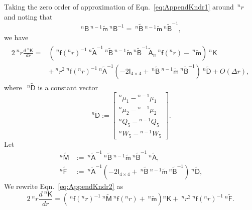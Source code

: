 \documentclass[preprint,10pt,times]{elsarticle}
\numberwithin{equation}{section}
\renewcommand{\u}[1]{\boldsymbol{#1}}
\newcommand{\usf}[1]{\u{\mathsf #1}}
\renewcommand{\>}{$\Rightarrow$}
\begin{document}
Taking the zero order of approximation of Eqn.~\eqref{eq:AppendKndr1} around~${}^{n}\!{r}$ and noting that
\begin{equation}
	~^{n}{\usf{B}} ~^{n-1}\tilde{\usf{m}} ~^{n}{\usf{B}}^{-1} = ~^{n}\tilde{\usf{B}} ~^{n-1}\tilde{\usf{m}} ~^{n}\tilde{\usf{B}}^{-1},
\end{equation}
we have
\begin{equation}
\begin{aligned}
	\begin{split}
	2 ~^{n}\!{r} \frac{d ~^{n}{\usf{K}}}{dr} = & \left( ~^{n}\usf{f}({}^{n}\!r)^{-1} ~^{n}\tilde{\usf{A}}^{-1} ~^{n}\tilde{\usf{B}} ~^{n-1}\tilde{\usf{m}} ~^{n}\tilde{\usf{B}}^{-1} \tilde{\usf{A}}_n ~^{n}\usf{f}({}^{n}\!r) - ~^{n}\tilde{\usf{m}} \right) ~^{n}{\usf{K}} \\
	& + ~^{n}\!{r}^2 ~^{n}\usf{f}({}^{n}\!r)^{-1} ~^{n}\tilde{\usf{A}}^{-1} \left( -2\usf{I}_{4\times 4} + ~^{n}\tilde{\usf{B}} ~^{n-1}\tilde{\usf{m}} ~^{n}\tilde{\usf{B}}^{-1} \right) ~^{n}\tilde{\usf{D}} + O(\Delta r),
	\end{split}
\end{aligned}
\label{eq:AppendKndr2}
\end{equation}
where~$~^{n}\tilde{\usf{D}}$ is a constant vector
\begin{equation}
	~^{n}\tilde{\usf{D}}
	:=
	\begin{bmatrix}
		{}^{n}\!{\mu_{1}}-{}^{n-1}\!{\mu_{1}} \\ {}^{n}\!{\mu_{2}}-{}^{n-1}\!{\mu_{2}}  \\ {}^{n}\!{Q_{5}}-{}^{n-1}\!{Q_{5}} \\ {}^{n}\!{W_{5}}-{}^{n-1}\!{W_{5}}
	\end{bmatrix} .
\end{equation}
Let
\begin{subequations}
	\begin{align}
	~^{n}\tilde{\usf{M}} & := ~^{n}\tilde{\usf{A}}^{-1} ~^{n}\tilde{\usf{B}} ~^{n-1}\tilde{\usf{m}} ~^{n}\tilde{\usf{B}}^{-1} ~^{n}\tilde{\usf{A}}, \\
	~^{n}\tilde{\usf{F}} & := ~^{n}\tilde{\usf{A}}^{-1} \left( -2\usf{I}_{4\times 4} + ~^{n}\tilde{\usf{B}} ~^{n-1}\tilde{\usf{m}} ~^{n}\tilde{\usf{B}}^{-1} \right) ~^{n}\tilde{\usf{D}},
	\end{align}
\end{subequations}
We rewrite Eqn.~\eqref{eq:AppendKndr2} as
\begin{equation}
	2 ~^{n}\!{r} \frac{d ~^{n}{\usf{K}}}{dr} = \left( ~^{n}\usf{f}({}^{n}\!r)^{-1} ~^{n}\tilde{\usf{M}} ~^{n}\usf{f}({}^{n}\!r) + ~^{n}\tilde{\usf{m}} \right) {}^{n}{\usf{K}} + ~^{n}\!{r}^2 ~^{n}\usf{f}({}^{n}\!r)^{-1} ~^{n}\tilde{\usf{F}}.
	\label{eq:AppendKndr}
\end{equation}
\end{document}
